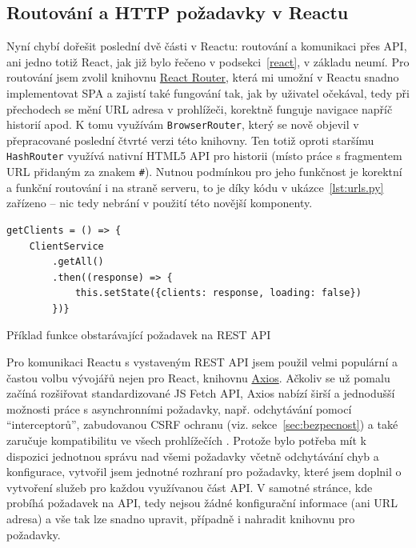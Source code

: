     \subsection{Routování a HTTP požadavky v Reactu}\label{subsec:reactPozadavky}
    Nyní chybí dořešit poslední dvě části v Reactu: routování a komunikaci přes API, ani jedno totiž React, jak již bylo řečeno v podsekci~\ref{react}, v základu neumí. Pro routování jsem zvolil knihovnu \href{https://reacttraining.com/}{React Router}, která mi umožní v Reactu snadno implementovat SPA a zajistí také fungování tak, jak by uživatel očekával, tedy při přechodech se mění URL adresa v prohlížeči, korektně funguje navigace napříč historií apod. K tomu využívám \verb|BrowserRouter|, který se nově objevil v přepracované poslední čtvrté verzi této knihovny. Ten totiž oproti staršímu \verb|HashRouter| využívá nativní HTML5 API pro historii (místo práce s fragmentem URL přidaným za znakem \verb|#|). Nutnou podmínkou pro jeho funkčnost je korektní a funkční routování i na straně serveru, to je díky kódu v ukázce~\ref{lst:urls.py} zařízeno -- nic tedy nebrání v použití této novější komponenty.
    
    \begin{listing}[ht]
    	\begin{verbatim}
getClients = () => {
    ClientService
        .getAll()
        .then((response) => {
            this.setState({clients: response, loading: false})
        })}
    	\end{verbatim}
    	\caption{Příklad funkce obstarávající požadavek na REST API}\label{lst:react3}
    \end{listing}
    
    Pro komunikaci Reactu s vystaveným REST API jsem použil velmi populární a častou volbu vývojářů nejen pro React, knihovnu \href{https://github.com/axios/axios}{Axios}. Ačkoliv se už pomalu začíná rozšiřovat standardizované JS Fetch API, Axios nabízí širší a jednodušší možnosti práce s asynchronními požadavky, např. odchytávání pomocí \enquote{interceptorů}, zabudovanou CSRF ochranu (viz. sekce~\ref{sec:bezpecnost}) a také zaručuje kompatibilitu ve všech prohlížečích \cite{axios}. Protože bylo potřeba mít k dispozici jednotnou správu nad všemi požadavky včetně odchytávání chyb a konfigurace, vytvořil jsem jednotné rozhraní pro požadavky, které jsem doplnil o vytvoření služeb pro každou využívanou část API. V samotné stránce, kde probíhá požadavek na API, tedy nejsou žádné konfigurační informace (ani URL adresa) a vše tak lze snadno upravit, případně i nahradit knihovnu pro požadavky. 
    
